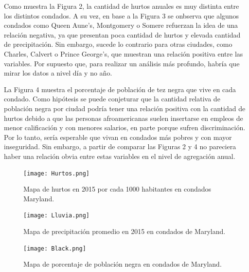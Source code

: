 \documentclass[10.5pt]{article}   %
\begin{document}
Como muestra la Figura 2, la cantidad de hurtos anuales es muy distinta entre los distintos condados. A su vez, en base a la Figura 3 se onbserva que algunos condados como Queen Aune's, Montgomery o Somere refuerzan la idea de una relación negativa, ya que presentan poca cantidad de hurtos y elevada cantidad de precipitación. Sin embargo, sucede lo contrario para otras ciudades, como Charles, Calvert o Prince George's, que muestran una relación positiva entre las variables. Por supuesto que, para realizar un análisis más profundo, habría que mirar los datos a nivel día y no año.

La Figura 4 muestra el porcentaje de población de tez negra que vive en cada condado. Como hipótesis se puede conjeturar que la cantidad relativa de población negra por ciudad podría tener una relación positiva con la cantidad de hurtos debido a que las personas afroamericanas suelen insertarse en empleos de menor calificación y con menores salarios, en parte porque sufren discriminación. Por lo tanto, sería esperable que vivan en condados más pobres y con mayor inseguridad. Sin embargo, a partir de comparar las Figuras 2 y 4 no pareciera haber una relación obvia entre estas variables en el nivel de agregación anual.



\begin{landscape}
\begin{figure}[H]
\centering
    \centering
    \texttt{[image: Hurtos.png]}
    \label{fig2}
\caption{Mapa de hurtos en 2015 por cada 1000 habitantes en condados Maryland.}
\end{figure}
\end{landscape}

\begin{landscape}
\begin{figure}[H]
\centering
    \centering
    \texttt{[image: Lluvia.png]}
    \label{fig2}
\caption{Mapa de precipitación promedio en 2015 en condados de Maryland.}
\end{figure}
\end{landscape}

\begin{landscape}
\begin{figure}[H]
\centering
    \centering
    \texttt{[image: Black.png]}
    \label{fig2}
\caption{Mapa de porcentaje de población negra en condados de Maryland.}
\end{figure}
\end{landscape}
\end{document}
